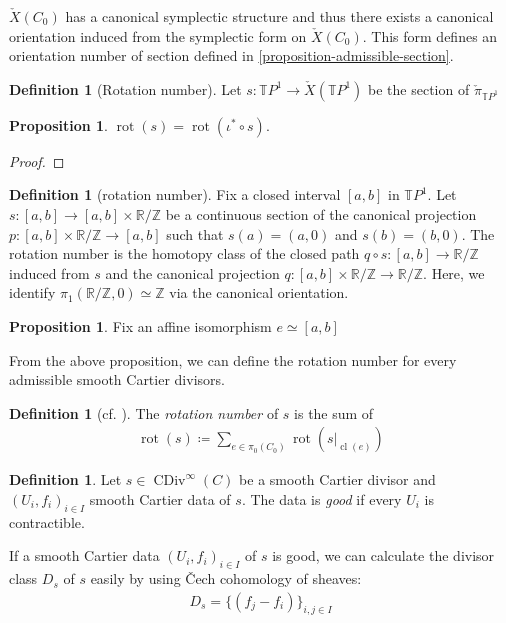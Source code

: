 \documentclass[a4paper,dvipdfmx,reqno,12pt]{amsart}
\theoremstyle{definition}
\newtheorem{definition}[theorem]{Definition}
\newtheorem{proposition}[theorem]{Proposition}
\newcommand{\deq}{\coloneqq}
\newcommand{\opn}[1]{\operatorname{#1}}
\numberwithin{equation}{section}
\begin{document}
$\check{X}(C_0)$ has a canonical symplectic structure
and thus there exists a canonical orientation induced
from the symplectic form on $\check{X}(C_0)$.
This form defines an orientation number of 
section defined in \cref{proposition-admissible-section}.

\begin{definition}[{Rotation number}]
Let $s\colon \mathbb{T}P^{1} \to \check{X}(\mathbb{T}P^{1})$ 
be the section of 
$\check{\pi}_{\mathbb{T}P^{1}}$
\end{definition}

\begin{proposition}
$\opn{rot}(s)=\opn{rot}(\iota^{*}\circ s)$.
\end{proposition}

\begin{proof}

\end{proof}

\begin{definition}[{rotation number}]
Fix a closed interval $[a,b]$ in $\mathbb{T}P^{1}$.
Let $s\colon [a,b]\to [a,b]\times \mathbb{R}/\mathbb{Z}$ be 
a continuous section of the canonical projection
$p\colon [a,b]\times \mathbb{R}/\mathbb{Z} \to [a,b]$
such that $s(a)=(a,0)$ and $s(b)=(b,0)$. 
The rotation number
is the homotopy class of the closed path
$q\circ s\colon [a,b]\to \mathbb{R}/\mathbb{Z}$
induced from $s$ and the canonical projection
$q\colon [a,b]\times \mathbb{R}/\mathbb{Z} 
\to \mathbb{R}/\mathbb{Z}$. Here, 
we identify $\pi_1(\mathbb{R}/\mathbb{Z},0)\simeq \mathbb{Z}$
via the canonical orientation.
\end{definition}

\begin{proposition}
Fix an affine isomorphism $e\simeq [a,b]$ 
\end{proposition}

From the above proposition, we can define the 
rotation number for every admissible smooth 
Cartier divisors.
\begin{definition}[{cf. \cite{auroux2022lagrangian}}]
The \emph{rotation number} of $s$ is the sum of
\begin{align}
\opn{rot}(s)\deq \sum_{e\in \pi_0(C_0)}
\opn{rot}(s|_{\opn{cl}(e)})
\end{align}

\end{definition}

\begin{definition}
Let $s\in \opn{CDiv}^{\infty}(C)$ be a smooth Cartier
divisor and $(U_i,f_i)_{i\in I}$ smooth Cartier data
of $s$. The data is \emph{good} if 
every $U_i$ is contractible.
\end{definition}
If a smooth Cartier data $(U_i,f_i)_{i\in I}$ of $s$ 
is good,
we can calculate the divisor class $D_s$ of $s$ easily
by using \v{C}ech cohomology of sheaves:
\begin{align}
D_s=\{(f_j-f_i)\}_{i,j\in I}
\end{align}
\end{document}

